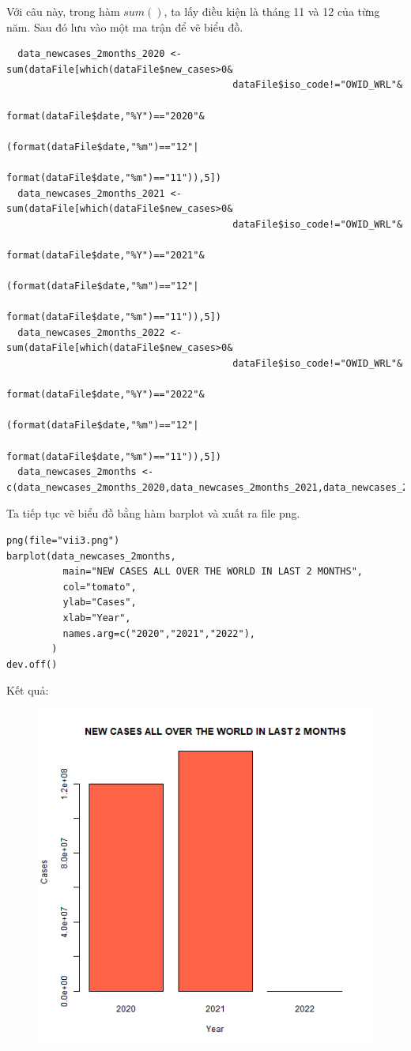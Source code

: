 \documentclass[a4paper]{article}
\theoremstyle{definition}
\begin{document}
\begin{enumerate}[1)]
Với câu này, trong hàm $sum()$, ta lấy điều kiện là tháng 11 và 12 của từng năm. Sau đó lưu vào một ma trận để vẽ biểu đồ.
\begin{lstlisting}
  data_newcases_2months_2020 <- sum(dataFile[which(dataFile$new_cases>0&
                                        dataFile$iso_code!="OWID_WRL"&
                                        format(dataFile$date,"%Y")=="2020"&
                                        (format(dataFile$date,"%m")=="12"|
                                        format(dataFile$date,"%m")=="11")),5]) 
  data_newcases_2months_2021 <- sum(dataFile[which(dataFile$new_cases>0&
                                        dataFile$iso_code!="OWID_WRL"&
                                        format(dataFile$date,"%Y")=="2021"&
                                        (format(dataFile$date,"%m")=="12"|
                                        format(dataFile$date,"%m")=="11")),5])
  data_newcases_2months_2022 <- sum(dataFile[which(dataFile$new_cases>0&
                                        dataFile$iso_code!="OWID_WRL"&
                                        format(dataFile$date,"%Y")=="2022"&
                                        (format(dataFile$date,"%m")=="12"|
                                        format(dataFile$date,"%m")=="11")),5])
  data_newcases_2months <- c(data_newcases_2months_2020,data_newcases_2months_2021,data_newcases_2months_2022)
\end{lstlisting}
Ta tiếp tục vẽ biểu đồ bằng hàm barplot và xuất ra file png.
\begin{lstlisting}
png(file="vii3.png")
barplot(data_newcases_2months,
          main="NEW CASES ALL OVER THE WORLD IN LAST 2 MONTHS",
          col="tomato",
          ylab="Cases",
          xlab="Year",
          names.arg=c("2020","2021","2022"),
        )
dev.off()
\end{lstlisting}
Kết quả:
\begin{figure}[H]
        \begin{center}
            \includegraphics[scale=0.45]{vii/vii3.png} 

\end{center}
\end{figure}
\end{enumerate}
\end{document}
